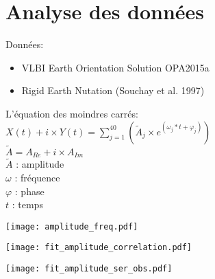 \section{Analyse des données}

\begin{frame}
Données: \\
	\begin{itemize}
		\item VLBI Earth Orientation Solution OPA2015a	
		\item Rigid Earth Nutation (Souchay et al. 1997)
	\end{itemize}
	\vspace{0.5cm}
	L'équation des moindres carrés: \\
	$X(t) + i \times Y(t) = \sum\limits_{j=1}^{40} (\widetilde{A}_{j} \times e^{(\omega_{j}*t + \varphi_{j})})$ \\
	$\widetilde{A} = A_{Re} + i \times A_{Im}$ \\

	\vspace{0.5cm}
	$\widetilde{A}$ : amplitude \\
	$\omega$ : fréquence \\
	$\varphi$ : phase \\
	$t$ : temps
\end{frame}

\begin{frame}
	\begin{center}
		\texttt{[image: amplitude\_freq.pdf]}
	\end{center}
\end{frame}

\begin{frame}
  \centerline{\texttt{[image: fit\_amplitude\_correlation.pdf]}}
\end{frame}


\begin{frame}
	\begin{center}
		\texttt{[image: fit\_amplitude\_ser\_obs.pdf]}
	\end{center} 
\end{frame}

